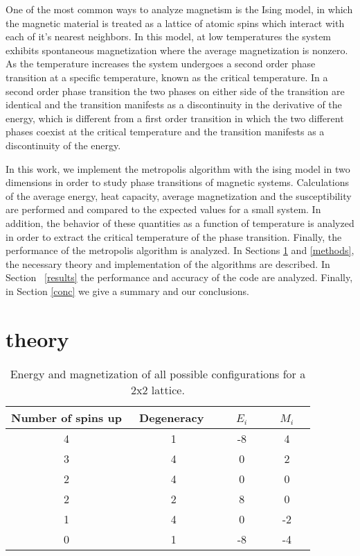\documentclass[prc,amsmath,twocolumn,superscriptaddress]{revtex4}
\begin{document}
One of the most common ways to analyze magnetism is the Ising model, in which the magnetic material is treated as a lattice of atomic spins which interact with each of it's nearest neighbors. In this model, at low temperatures the system exhibits spontaneous magnetization where the average magnetization is nonzero. As the temperature increases the system undergoes a second order phase transition at a specific temperature, known as the critical temperature. In a second order phase transition the two phases on either side of the transition are identical and the transition manifests as a discontinuity in the derivative of the energy, which is different from a first order transition in which the two different phases coexist at the critical temperature and the transition manifests as a discontinuity of the energy.

In this work, we implement the metropolis algorithm with the ising model in two dimensions in order to study phase transitions of magnetic systems. Calculations of the average energy, heat capacity, average magnetization and the susceptibility are performed and compared to the expected values for a small system. In addition, the behavior of these quantities as a function of temperature is analyzed in order to extract the critical temperature of the phase transition. Finally, the performance of the metropolis algorithm is analyzed. In Sections \ref{theory} and \ref{methods}, the necessary theory and implementation of the algorithms are described. In Section ~\ref{results} the performance and accuracy of the code are analyzed. Finally, in Section \ref{conc} we give a summary and our conclusions.

\section{theory}
\label{theory}
\begin{table}[h]
\centering
\begin{tabular}{|c|c|c|c|}
\hline
Number of spins up & ~Degeneracy ~& ~ $E_i$ ~& ~ $M_i$ ~\\
\hline
4&1&-8&4\\
3&4&0&2\\
2&4&0&0\\
2&2&8&0\\
1&4&0&-2\\
0&1&-8&-4\\
\hline
\end{tabular}
\caption{Energy and magnetization of all possible configurations for a 2x2 lattice.}
\label{comp}
\end{table}
\end{document}
